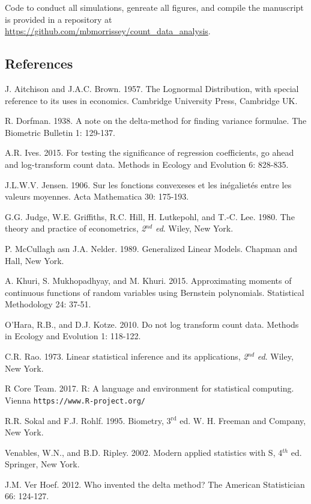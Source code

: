 \documentclass[]{article}
\begin{document}
Code to conduct all simulations, genreate all figures, and compile the
manuscript is provided in a repository at
\url{https://github.com/mbmorrissey/count_data_analysis}.

\subsection{References}\label{references}

J. Aitchison and J.A.C. Brown. 1957. The Lognormal Distribution, with
special reference to its uses in economics. Cambridge University Press,
Cambridge UK.

R. Dorfman. 1938. A note on the delta-method for finding variance
formulae. The Biometric Bulletin 1: 129-137.

A.R. Ives. 2015. For testing the significance of regression
coefficients, go ahead and log-transform count data. Methods in Ecology
and Evolution 6: 828-835.

J.L.W.V. Jensen. 1906. Sur les fonctions convexeses et les inégalietés
entre les valeurs moyennes. Acta Mathematica 30: 175-193.

G.G. Judge, W.E. Griffiths, R.C. Hill, H. Lutkepohl, and T.-C. Lee.
1980. The theory and practice of econometrics, \textit{2}\(^{nd}\)
\textit{ed}. Wiley, New York.

P. McCullagh asn J.A. Nelder. 1989. Generalized Linear Models. Chapman
and Hall, New York.

A. Khuri, S. Mukhopadhyay, and M. Khuri. 2015. Approximating moments of
continuous functions of random variables using Bernstein polynomials.
Statistical Methodology 24: 37-51.

O'Hara, R.B., and D.J. Kotze. 2010. Do not log transform count data.
Methods in Ecology and Evolution 1: 118-122.

C.R. Rao. 1973. Linear statistical inference and its applications,
\textit{2}\(^{nd}\) \textit{ed}. Wiley, New York.

R Core Team. 2017. R: A language and environment for statistical
computing. Vienna \texttt{https://www.R-project.org/}

R.R. Sokal and F.J. Rohlf. 1995. Biometry, 3\(^{\text{rd}}\) ed. W. H.
Freeman and Company, New York.

Venables, W.N., and B.D. Ripley. 2002. Modern applied statistics with S,
4\(^{th}\) ed. Springer, New York.

J.M. Ver Hoef. 2012. Who invented the delta method? The American
Statistician 66: 124-127.
\end{document}

